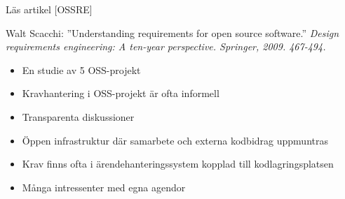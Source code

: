 \documentclass{simpleslides}
\begin{document}
\begin{Slide}{Läs artikel [OSSRE]}

{\small
Walt Scacchi: ''Understanding requirements for open source software.'' \textit{Design requirements engineering: A ten-year perspective. Springer, 2009. 467-494. }}
\begin{itemize}
  \item En studie av 5 OSS-projekt
  \item Kravhantering i OSS-projekt är ofta informell
  \item Transparenta diskussioner
  \item Öppen infrastruktur där samarbete och externa kodbidrag uppmuntras
  \item Krav finns ofta i ärendehanteringssystem kopplad till kodlagringsplatsen
  \item Många intressenter med egna agendor
\end{itemize}  

\end{Slide}






\end{document}
